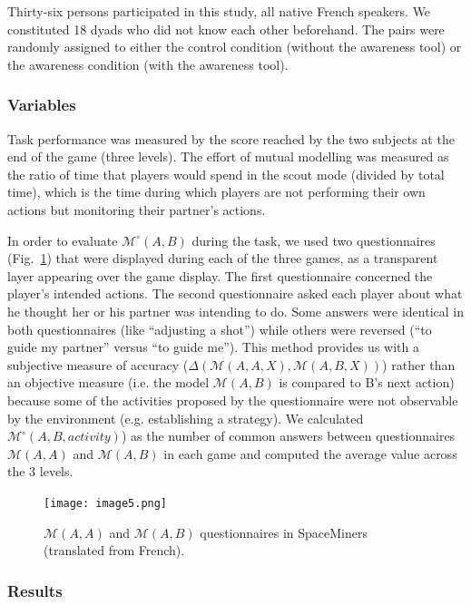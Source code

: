 \documentclass[natbib]{svjour3}
\newcommand{\ie}{i.e.\xspace}
\newcommand{\eg}{e.g.\xspace}
\newcommand{\B}{B\xspace}
\newcommand{\M}[3]{{\mathcal{M}(#1, #2, #3)}}
\newcommand{\gmodel}[2]{{$\mathcal{M}(#1, #2)$}}
\newcommand{\Model}[3]{{$\mathcal{M}^{\circ}(#1, #2, #3)$}}
\newcommand{\gModel}[2]{{$\mathcal{M}^{\circ}(#1, #2)$}}
\begin{document}
Thirty-six persons participated in this study, all native French speakers. We
constituted 18 dyads who did not know each other beforehand. The pairs were
randomly assigned to either the control condition (without the awareness tool)
or the awareness condition (with the awareness tool).

\subsubsection*{Variables}

Task performance was measured by the score reached by the two subjects at the
end of the game (three levels). The effort of mutual modelling was measured as
the ratio of time that players would spend in the scout mode (divided by total
time), which is the time during which players are not performing their own
actions but monitoring their partner's actions.

In order to evaluate \gModel{A}{B} during the task, we used two questionnaires
(Fig.~\ref{study1:questionnaires}) that were displayed during each of the three
games, as a transparent layer appearing over the game display. The first
questionnaire concerned the player's intended actions. The second questionnaire
asked each player about what he thought her or his partner was intending to do.
Some answers were identical in both questionnaires (like ``adjusting a shot'')
while others were reversed (``to guide my partner'' versus ``to guide me'').
This method provides us with a subjective measure of accuracy
($\Delta(\M{A}{A}{X}, \M{A}{B}{X})$) rather than an objective measure (\ie the
model \gmodel{A}{B} is compared to \B's next action) because some of the
activities proposed by the questionnaire were not observable by the environment
(\eg establishing a strategy). We calculated \Model{A}{B}{activity})
as the number of common answers between questionnaires \gmodel{A}{A} and
\gmodel{A}{B} in each game and computed the average value across the 3 levels.

\begin{figure}[ht!]
        \centering
        \texttt{[image: image5.png]}
        \caption{\gmodel{A}{A} and \gmodel{A}{B} questionnaires in SpaceMiners
        (translated from French).}

        \label{study1:questionnaires}
\end{figure}

\subsubsection*{Results}
\end{document}
